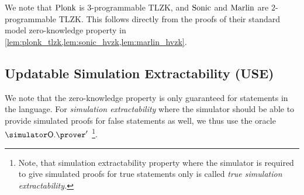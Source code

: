 We note that $\textnormal{{Plonk}}$ is $3$-programmable TLZK, and ${\textnormal{{Sonic}}}$ and ${\textnormal{{Marlin}}}$ are $2$-programmable TLZK. This follows directly from the proofs of
their standard model zero-knowledge property in
\cref{lem:plonk_tlzk,lem:sonic_hvzk,lem:marlin_hvzk}.

\subsection{Updatable Simulation Extractability (USE)}
We note that the zero-knowledge property is only guaranteed for statements in the
language.
For \emph{simulation extractability} where the simulator
should be able to provide simulated proofs for false statements as well, we thus use the oracle $\simOP'$
\footnote{Note,
  that simulation extractability property where the simulator is required to give
  simulated proofs for true statements only is called \emph{true simulation
    extractability.}}. 
	
%



